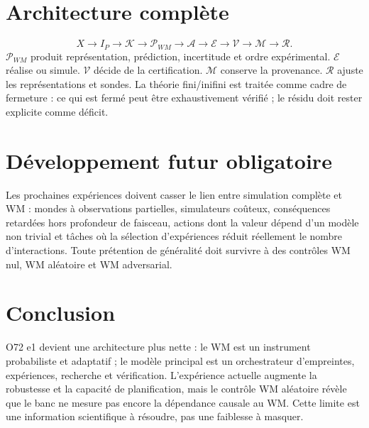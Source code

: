 \documentclass[11pt,a4paper]{article}
\begin{document}
\section{Architecture complète}
\[
X\rightarrow I_P\rightarrow\mathcal K\rightarrow\mathcal P_{WM}\rightarrow\mathcal A\rightarrow\mathcal E\rightarrow\mathcal V\rightarrow\mathcal M\rightarrow\mathcal R.
\]
$\mathcal P_{WM}$ produit représentation, prédiction, incertitude et ordre expérimental. $\mathcal E$ réalise ou simule. $\mathcal V$ décide de la certification. $\mathcal M$ conserve la provenance. $\mathcal R$ ajuste les représentations et sondes. La théorie fini/inifini est traitée comme cadre de fermeture : ce qui est fermé peut être exhaustivement vérifié ; le résidu doit rester explicite comme déficit.
\section{Développement futur obligatoire}
Les prochaines expériences doivent casser le lien entre simulation complète et WM : mondes à observations partielles, simulateurs coûteux, conséquences retardées hors profondeur de faisceau, actions dont la valeur dépend d'un modèle non trivial et tâches où la sélection d'expériences réduit réellement le nombre d'interactions. Toute prétention de généralité doit survivre à des contrôles WM nul, WM aléatoire et WM adversarial.
\section{Conclusion}
O72 e1 devient une architecture plus nette : le WM est un instrument probabiliste et adaptatif ; le modèle principal est un orchestrateur d'empreintes, expériences, recherche et vérification. L'expérience actuelle augmente la robustesse et la capacité de planification, mais le contrôle WM aléatoire révèle que le banc ne mesure pas encore la dépendance causale au WM. Cette limite est une information scientifique à résoudre, pas une faiblesse à masquer.
\end{document}
